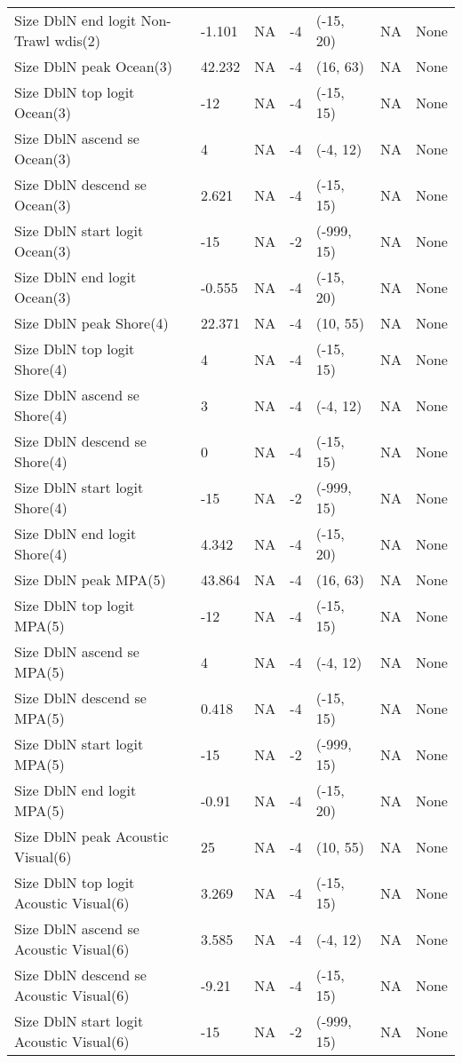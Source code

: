 \documentclass[11pt,
  english,
  letterpaper,
]{article}
\begin{document}
\begin{landscape}
\begin{longtable}[t]{>{\raggedright\arraybackslash}p{7.5cm}lllll>{\raggedright\arraybackslash}p{3.5cm}}
Size DblN end logit Non-Trawl wdis(2) & -1.101 & NA & -4 & (-15, 20) & NA & None\\
Size DblN peak Ocean(3) & 42.232 & NA & -4 & (16, 63) & NA & None\\
Size DblN top logit Ocean(3) & -12 & NA & -4 & (-15, 15) & NA & None\\
Size DblN ascend se Ocean(3) & 4 & NA & -4 & (-4, 12) & NA & None\\
Size DblN descend se Ocean(3) & 2.621 & NA & -4 & (-15, 15) & NA & None\\
Size DblN start logit Ocean(3) & -15 & NA & -2 & (-999, 15) & NA & None\\
Size DblN end logit Ocean(3) & -0.555 & NA & -4 & (-15, 20) & NA & None\\
Size DblN peak Shore(4) & 22.371 & NA & -4 & (10, 55) & NA & None\\
Size DblN top logit Shore(4) & 4 & NA & -4 & (-15, 15) & NA & None\\
Size DblN ascend se Shore(4) & 3 & NA & -4 & (-4, 12) & NA & None\\
Size DblN descend se Shore(4) & 0 & NA & -4 & (-15, 15) & NA & None\\
Size DblN start logit Shore(4) & -15 & NA & -2 & (-999, 15) & NA & None\\
Size DblN end logit Shore(4) & 4.342 & NA & -4 & (-15, 20) & NA & None\\
Size DblN peak MPA(5) & 43.864 & NA & -4 & (16, 63) & NA & None\\
Size DblN top logit MPA(5) & -12 & NA & -4 & (-15, 15) & NA & None\\
Size DblN ascend se MPA(5) & 4 & NA & -4 & (-4, 12) & NA & None\\
Size DblN descend se MPA(5) & 0.418 & NA & -4 & (-15, 15) & NA & None\\
Size DblN start logit MPA(5) & -15 & NA & -2 & (-999, 15) & NA & None\\
Size DblN end logit MPA(5) & -0.91 & NA & -4 & (-15, 20) & NA & None\\
Size DblN peak Acoustic Visual(6) & 25 & NA & -4 & (10, 55) & NA & None\\
Size DblN top logit Acoustic Visual(6) & 3.269 & NA & -4 & (-15, 15) & NA & None\\
Size DblN ascend se Acoustic Visual(6) & 3.585 & NA & -4 & (-4, 12) & NA & None\\
Size DblN descend se Acoustic Visual(6) & -9.21 & NA & -4 & (-15, 15) & NA & None\\
Size DblN start logit Acoustic Visual(6) & -15 & NA & -2 & (-999, 15) & NA & None\\

\end{longtable}
\end{landscape}
\end{document}
